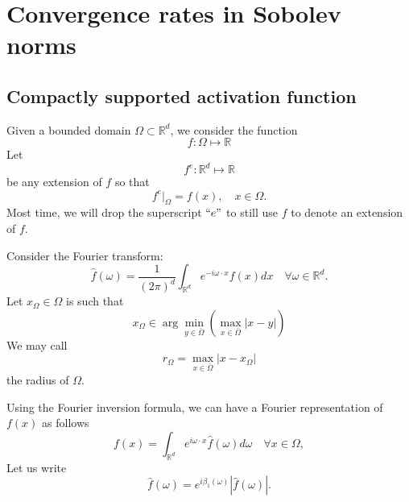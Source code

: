 \section{Convergence rates in Sobolev norms}
\subsection{Compactly supported activation function}
Given a bounded domain $\Omega\subset\mathbb R^d$, we consider the function
$$
f: \Omega\mapsto \mathbb R
$$
Let 
$$
f^e: \mathbb R^d\mapsto \mathbb R
$$ 
be any extension of $f$ so that
$$
f^e|_\Omega=f(x), \quad x\in \Omega. 
$$
Most time, we will drop the superscript $``e"$ to still use $f$ to
denote an extension of $f$. 

Consider the Fourier transform:
\begin{equation}
\label{Fourier}
\hat f(\omega)=\frac{1}{(2\pi)^d}\int_{\mathbb{R}^d}e^{-i\omega\cdot x}f(x)dx
\quad \forall \omega \in \mathbb R^d.
\end{equation}
Let $x_\Omega\in\Omega$ is such that
\begin{equation}
\label{xOmega}
x_\Omega\in \arg\min_{y\in\bar\Omega}(\max_{x\in\bar\Omega}|x-y|)
\end{equation}
We may call
\begin{equation}
\label{rOmega}
r_\Omega=\max_{x\in\bar\Omega}|x-x_\Omega|
\end{equation}
the radius of $\Omega$.


Using the Fourier inversion formula, we can have a Fourier
representation of $f(x)$ as follows
\begin{equation}
\label{eqn1}
f(x)=\int_{\mathbb{R}^d}e^{i\omega\cdot x}\hat{f}(\omega)d\omega
\quad \forall x \in \Omega,
\end{equation}
Let us write
\begin{equation}
\label{theta-omega}
\hat{f}(\omega)=e^{i\beta_1(\omega)}|\hat{f}(\omega)|.   
\end{equation}



